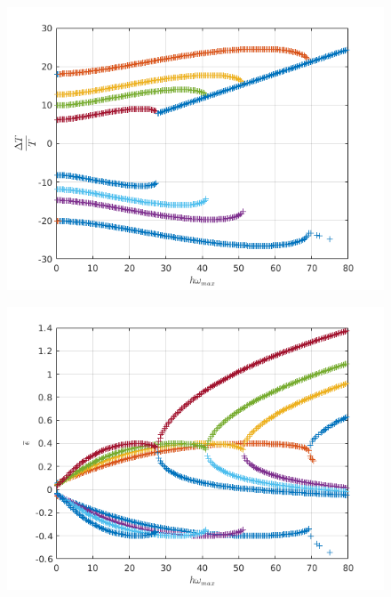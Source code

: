 \begin{itemize}
\begin{figure}[H]
\centering
\begin{minipage}{.5\textwidth}
  \centering
  \includegraphics[width=.90\linewidth]{images/rel_per_err_pml_exp_10.png}
  \label{fig:rel_per_err_pml_exp_10}
\end{minipage}%
\begin{minipage}{.5\textwidth}
  \centering
  \includegraphics[width=.99\linewidth]{images/num_damp_pml_exp_10.png}
  \label{fig:num_damp_pml_exp_10}
\end{minipage}
\end{figure}   

\end{itemize}
